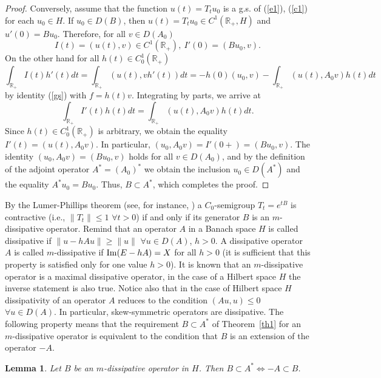 \documentclass[12pt]{article}
\newcommand{\R}{{\mathbb R}}
\renewcommand{\Im}{\mathop{\rm Im}}
\numberwithin{equation}{section}
\theoremstyle{plain}
\newtheorem{lemma}{Lemma}[section]
\theoremstyle{definition}
\begin{document}
\begin{proof}
Conversely, assume that the function $u(t)=T_tu_0$ is a g.s. of (\ref{e1}), (\ref{c1}) for each $u_0\in H$. If $u_0\in D(B)$, then  $u(t)=T_tu_0\in C^1(\R_+,H)$ and  $u'(0)=Bu_0$. Therefore, for all $v\in D(A_0)$
\[
I(t)=(u(t),v)\in C^1(\R_+), \ I'(0)=(Bu_0,v).
\]
On the other hand for all $h(t)\in C_0^1(\R_+)$
\[
\int_{\R_+} I(t)h'(t)dt=\int_{\R_+} (u(t),vh'(t))dt=
-h(0)(u_0,v)-\int_{\R_+} (u(t),A_0v)h(t)dt
\]
by identity (\ref{gs}) with $f=h(t)v$. Integrating by parts, we arrive at
\[
\int_{\R_+} I'(t)h(t)dt=\int_{\R_+} (u(t),A_0v)h(t)dt.
\]
Since $h(t)\in C_0^1(\R_+)$ is arbitrary, we obtain the equality $I'(t)=(u(t),A_0v)$. In particular,
$(u_0,A_0v)=I'(0+)=(Bu_0,v)$. The identity $(u_0,A_0v)=(Bu_0,v)$ holds for all $v\in D(A_0)$, and by the definition of the adjoint operator $A^*=(A_0)^*$ we obtain the inclusion $u_0\in D(A^*)$ and the equality $A^*u_0=Bu_0$. Thus, $B\subset A^*$, which completes the proof.
\end{proof}

By the Lumer-Phillips theorem (see, for instance, \cite[Theorem~1.1.3]{Phil}) a $C_0$-semigroup $T_t=e^{tB}$ is contractive (i.e., $\|T_t\|\le 1$ $\forall t>0$) if and only if its generator $B$ is an $m$-dissipative operator. Remind that an operator $A$ in a Banach space $H$ is called dissipative if $\|u-hAu\|\ge \|u\|$ $\forall u\in D(A)$, $h>0$. A dissipative operator $A$ is called $m$-dissipative if $\Im (E-hA)=X$ for all $h>0$ (it is sufficient that this property is satisfied only for one value $h>0$). It is known that an $m$-dissipative operator is a maximal dissipative operator, in the case of a Hilbert space $H$ the inverse statement is also true. Notice also that in the case of Hilbert space $H$ dissipativity of an operator $A$ reduces to the condition  $(Au,u)\le 0$ $\forall u\in D(A)$. In particular, skew-symmetric operators are dissipative. The following property means that the requirement $B\subset A^*$ of Theorem~\ref{th1} for an
$m$-dissipative operator is equivalent to the condition that $B$ is an extension of the operator $-A$.

\begin{lemma}\label{lem1}
Let $B$ be an $m$-dissipative operator in $H$. Then $B\subset A^*\Leftrightarrow -A\subset B$.
\end{lemma}
\end{document}
